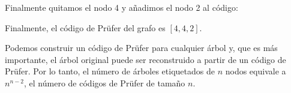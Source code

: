 Finalmente quitamos el nodo 4 y añadimos el nodo 2 al código:
\begin{center}
\end{center}

Finalmente, el código de Prüfer del grafo es $[4,4,2]$.

Podemos construir un código de Prüfer para cualquier árbol y, que es más
importante, el árbol original puede ser reconstruido a partir de un
código de Prüfer. Por lo tanto, el número de árboles etiquetados de $n$ nodos
equivale a $n^{n-2}$, el número de códigos de Prüfer de tamaño $n$.
